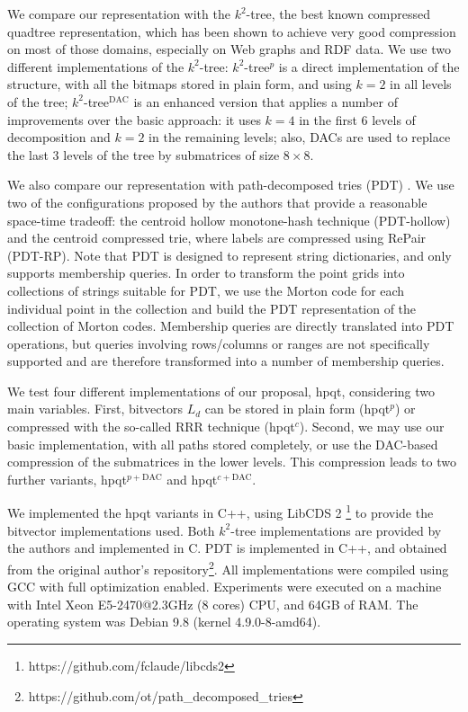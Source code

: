 \documentclass{elsarticle}
\newcommand{\DAC}{\ensuremath{\mathrm{DAC}}}
\newcommand{\kt}{$k^2$-tree\xspace}
\newcommand{\ktplain}{$k^2$-tree$^p$\xspace}
\newcommand{\ktdac}{$k^2$-tree$^{\DAC}$\xspace}
\newcommand{\hpqt}{\textsf{hpqt}\xspace}
\newcommand{\hpqtp}{\textsf{hpqt$^p$}\xspace}
\newcommand{\hpqtR}{\textsf{hpqt$^{c}$}\xspace}
\newcommand{\hpqtpdac}{\textsf{hpqt$^{p+\DAC}$}\xspace}
\newcommand{\hpqtRdac}{\textsf{hpqt$^{c+\DAC}$}\xspace}
\newcommand{\pdt}{PDT\xspace}
\newcommand{\pdth}{PDT-hollow\xspace}
\newcommand{\pdtrp}{PDT-RP\xspace}
\begin{document}
We compare our representation with the \kt \cite{BLN14}, the best known compressed quadtree representation, which has been shown to achieve very good compression on most of those domains, especially on Web graphs and RDF data. We use two different implementations of the \kt: \ktplain is a direct implementation of the structure, with all the bitmaps stored in plain form, and using $k=2$ in all levels of the tree; \ktdac is an enhanced version that applies a number of improvements over the basic approach: it uses $k=4$ in the first 6 levels of decomposition and $k=2$ in the remaining levels; also, DACs are used to replace the last 3 levels of the tree by submatrices of size $8 \times 8$.

We also compare our representation with path-decomposed tries (\pdt) \cite{GO14}. We use two of the configurations proposed by the authors that provide a reasonable space-time tradeoff: the centroid hollow monotone-hash technique (\pdth) and the centroid compressed trie, where labels are compressed using RePair (\pdtrp). Note that \pdt is designed to represent string dictionaries, and only supports membership queries. In order to transform the point grids into collections of strings suitable for \pdt, we use the Morton code for each individual point in the collection and build the \pdt representation of the collection of Morton codes. Membership queries are directly translated into \pdt operations, but queries involving rows/columns or ranges are not specifically supported and are therefore transformed into a number of membership queries.

We test four different implementations of our proposal, \hpqt, considering two main variables. First, bitvectors $L_d$ can be stored in plain form (\hpqtp) or compressed with the so-called RRR technique \cite{RRR} (\hpqtR). Second, we may use our basic implementation, with all  paths stored completely, or use the DAC-based compression of the submatrices in the lower levels. This compression leads to two further variants, \hpqtpdac and \hpqtRdac.

We implemented the \hpqt variants in C++, using LibCDS 2 \footnote{https://github.com/fclaude/libcds2} to provide the bitvector implementations used. Both \kt implementations are provided by the authors and implemented in C. PDT is implemented in C++, and obtained from the original author's repository\footnote{https://github.com/ot/path\_decomposed\_tries}. All implementations were compiled using GCC with full optimization enabled. Experiments were executed on a machine with Intel Xeon E5-2470@2.3GHz (8 cores) CPU, and 64GB of RAM. The operating system was Debian 9.8 (kernel 4.9.0-8-amd64).
\end{document}
